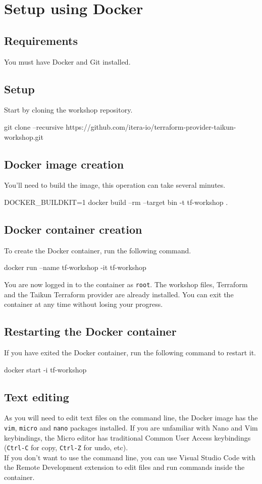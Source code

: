 \section{Setup using Docker}\label{sec:docker}

\subsection{Requirements}
You must have Docker and Git installed.

\subsection{Setup}
Start by cloning the workshop repository.
\begin{shell}
git clone --recursive https://github.com/itera-io/terraform-provider-taikun-workshop.git
\end{shell}

\subsection{Docker image creation}
You'll need to build the image, this operation can take several minutes.
\begin{shell}
DOCKER_BUILDKIT=1 docker build --rm --target bin -t tf-workshop .
\end{shell}

\subsection{Docker container creation}
To create the Docker container, run the following command.
\begin{shell}
docker run --name tf-workshop -it tf-workshop
\end{shell}
You are now logged in to the container as \texttt{root}. The workshop files,
Terraform and the Taikun Terraform provider are already installed.
You can exit the container at any time without losing your progress.

\subsection{Restarting the Docker container}
If you have exited the Docker container, run the following command to restart it.
\begin{shell}
docker start -i tf-workshop
\end{shell}

\subsection{Text editing}
As you will need to edit text files on the command line,
the Docker image has the \texttt{vim}, \texttt{micro} and \texttt{nano} packages installed.
If you are unfamiliar with Nano and Vim keybindings, the Micro editor
has traditional Common User Access keybindings (\texttt{Ctrl-C} for copy,
\texttt{Ctrl-Z} for undo, etc).\\

If you don't want to use the command line, you can use Visual Studio Code with
the Remote Development extension to edit files and run commands inside the
container.

